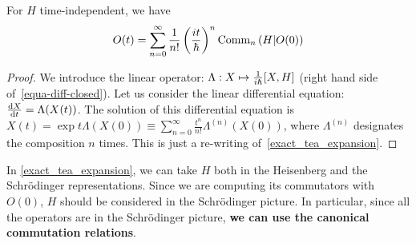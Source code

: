 \begin{theorem} 
    For $H$ time-independent, we have
    \begin{equation} \label{exact_tea_expansion}
        O(t) = \sum_{n = 0}^\infty \frac{1}{n!} \left(\frac{i t}{\hbar}\right)^n \text{Comm}_{n}\left(H | O(0)\right)
    \end{equation}
\end{theorem}

\begin{proof}
    We introduce the linear operator: $\Lambda : X \mapsto \ihbar \commutator{X}{H}$ (right hand side of~\autoref{equa-diff-closed}). Let us consider the linear differential equation: $\dv{X}{t}(t) = \Lambda(X(t))$. The solution of this differential equation is $X(t) = \exp{t \Lambda}(X(0)) \equiv \sum_{n = 0}^\infty \frac{t^n}{n!} \Lambda^{(n)}(X(0))$, where $\Lambda^{(n)}$ designates the composition $n$ times. This is just a re-writing of~\autoref{exact_tea_expansion}.
\end{proof}

\begin{remark}
    In \autoref{exact_tea_expansion}, we can take $H$ both in the Heisenberg and the Schrödinger representations. Since we are computing its commutators with $O(0)$, $H$ should be considered in the Schrödinger picture. In particular, since all the operators are in the Schrödinger picture, \textbf{we can use the canonical commutation relations}.
\end{remark}